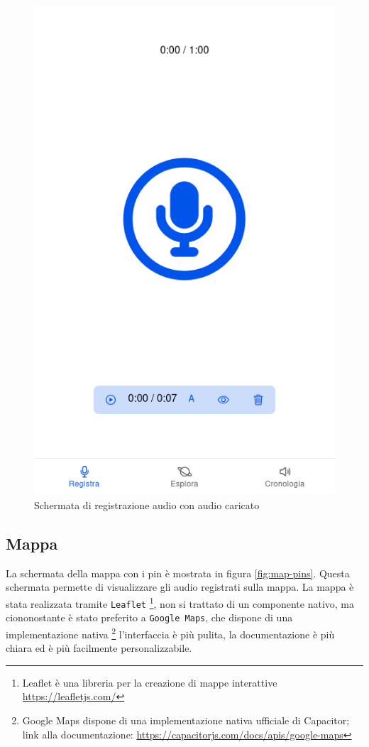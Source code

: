 \documentclass{article}
\begin{document}
\begin{figure}[H]
\begin{minipage}{0.30\textwidth}
        \includegraphics[width=\linewidth]{redorded-uploaded.png}
        \centering
        \caption{Schermata di registrazione audio con audio caricato}
        \label{fig:redorded-uploaded}
    \end{minipage}
\end{figure}

\subsection{Mappa}
La schermata della mappa con i pin è mostrata in figura \ref{fig:map-pins}. Questa schermata permette di visualizzare gli audio registrati sulla mappa. La mappa è stata realizzata tramite \texttt{Leaflet} \footnote{Leaflet è una libreria per la creazione di mappe interattive \url{https://leafletjs.com/}}, non si trattato di un componente nativo, ma ciononostante è stato preferito a \texttt{Google Maps}, che dispone di una implementazione nativa \footnote{Google Maps dispone di una implementazione nativa ufficiale di Capacitor; link alla documentazione: \url{https://capacitorjs.com/docs/apis/google-maps}} l'interfaccia è più pulita, la documentazione è più chiara ed è più facilmente personalizzabile.
\end{document}
